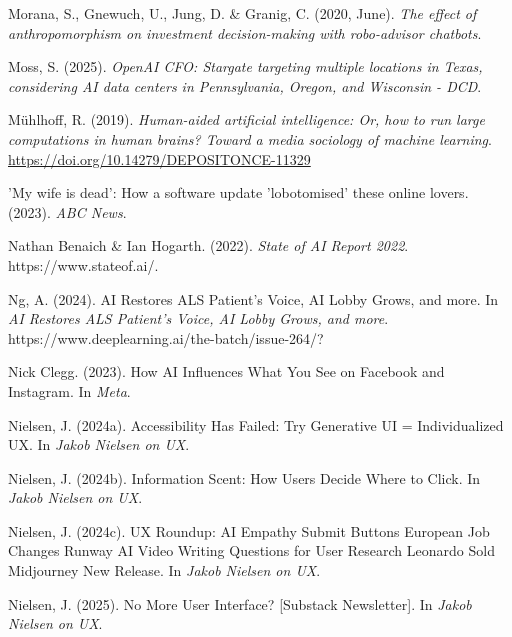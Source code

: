 \documentclass[
  letterpaper,
  DIV=11,
  numbers=noendperiod]{scrartcl}
\newlength{\cslhangindent}
\newenvironment{CSLReferences}[2] %
 {\begin{list}{}{%
  \setlength{\itemindent}{0pt}
  \setlength{\leftmargin}{0pt}
  \setlength{\parsep}{0pt}
  \ifodd #1
   \setlength{\leftmargin}{\cslhangindent}
   \setlength{\itemindent}{-1\cslhangindent}
  \fi
  \setlength{\itemsep}{#2\baselineskip}}}
 {\end{list}}
\begin{document}
\begin{CSLReferences}{1}{0}
Morana, S., Gnewuch, U., Jung, D. \& Granig, C. (2020, June). \emph{The
effect of anthropomorphism on investment decision-making with
robo-advisor chatbots}.

Moss, S. (2025). \emph{{OpenAI CFO}: {Stargate} targeting multiple
locations in {Texas}, considering {AI} data centers in {Pennsylvania},
{Oregon}, and {Wisconsin} - {DCD}}.

Mühlhoff, R. (2019). \emph{Human-aided artificial intelligence: {Or},
how to run large computations in human brains? {Toward} a media
sociology of machine learning}.
\url{https://doi.org/10.14279/DEPOSITONCE-11329}

'{My} wife is dead': {How} a software update 'lobotomised' these online
lovers. (2023). \emph{ABC News}.

Nathan Benaich \& Ian Hogarth. (2022). \emph{State of {AI Report} 2022}.
https://www.stateof.ai/.

Ng, A. (2024). {AI Restores ALS Patient}'s {Voice}, {AI Lobby Grows},
and more. In \emph{AI Restores ALS Patient's Voice, AI Lobby Grows, and
more}. https://www.deeplearning.ai/the-batch/issue-264/?

Nick Clegg. (2023). How {AI Influences What You See} on {Facebook} and
{Instagram}. In \emph{Meta}.

Nielsen, J. (2024a). Accessibility {Has Failed}: {Try Generative UI} =
{Individualized UX}. In \emph{Jakob Nielsen on UX}.

Nielsen, J. (2024b). Information {Scent}: {How Users Decide Where} to
{Click}. In \emph{Jakob Nielsen on UX}.

Nielsen, J. (2024c). {UX Roundup}: {AI Empathy} {\textbar} {Submit
Buttons} {\textbar} {European Job Changes} {\textbar} {Runway AI Video}
{\textbar} {Writing Questions} for {User Research} {\textbar} {Leonardo
Sold} {\textbar} {Midjourney New Release}. In \emph{Jakob Nielsen on
UX}.

Nielsen, J. (2025). No {More User Interface}? {[}Substack Newsletter{]}.
In \emph{Jakob Nielsen on UX}.


\end{CSLReferences}
\end{document}
